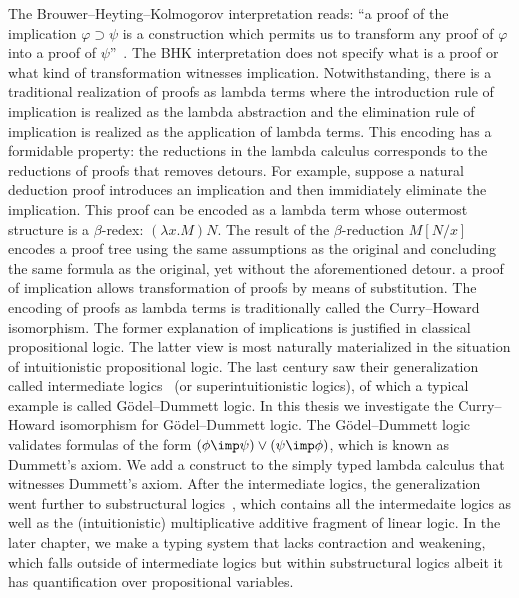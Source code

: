 The
Brouwer--Heyting--Kolmogorov interpretation reads: ``a proof of the
implication $\varphi\supset\psi$ is a construction which permits us to
 transform any proof of $\varphi$ into a proof of $\psi$''~.
The BHK
interpretation does not specify what is a proof or what kind of
transformation witnesses implication.
Notwithstanding, there is a
traditional realization of proofs as lambda terms where the
introduction rule of implication is realized as the lambda abstraction
and the elimination rule of implication is realized as the application
of lambda terms.
This encoding has a formidable property:
the reductions in the lambda calculus corresponds to the reductions of
proofs that
removes detours.
For example, suppose a natural deduction proof introduces an implication and then
immidiately eliminate the
implication.  This proof can be encoded as a lambda term whose outermost
structure is a $\beta$-redex: $(\lambda x. M)N$.
 The result of the $\beta$-reduction $M[N/x]$ encodes a proof tree using
 the same assumptions as the original and concluding the same formula as
 the original, yet without the aforementioned detour.
 a proof of implication allows transformation of proofs
by means of
substitution.  The encoding of proofs as lambda terms is traditionally
called the Curry--Howard isomorphism.
The former explanation of implications is justified in classical propositional logic.
The latter view is most naturally materialized in the situation of
intuitionistic propositional logic.  The last century saw their
generalization called intermediate logics~\citep{umezawa} (or superintuitionistic
logics), of which a typical example is called G\"odel--Dummett logic.
In this thesis we investigate the Curry--Howard isomorphism for
G\"odel--Dummett logic.  The G\"odel--Dummett logic validates formulas
of the form $(\phi\imp\psi)\lor(\psi\imp\phi)$, which is known as
Dummett's axiom.  We add a construct to the simply typed lambda calculus
that witnesses Dummett's axiom.
After the intermediate logics, the generalization went further to
substructural
logics~, which contains all the intermedaite logics as
well as the
(intuitionistic) multiplicative
additive fragment of linear logic.
In the later chapter, we make a typing system that lacks contraction and
weakening, which falls outside of intermediate logics but within
substructural logics albeit it has quantification over propositional variables.


